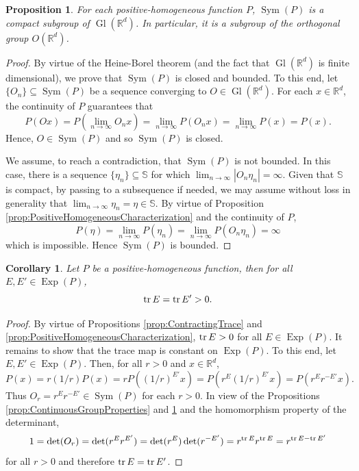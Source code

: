 \documentclass[11pt, letter]{book}
\newtheorem{corollary}[theorem]{Corollary}
\newtheorem{proposition}[theorem]{Proposition}
\newcommand\Gl{\operatorname{Gl}} %
\newcommand\Sym{\operatorname{Sym}}
\newcommand\Exp{\operatorname{Exp}}
\renewcommand\det{\operatorname{det}}
\begin{document}
\begin{framed}
\begin{proposition}\label{prop:SymCompact}
For each positive-homogeneous function $P$, $\Sym(P)$ is a compact subgroup of $\Gl(\mathbb{R}^d)$. In particular, it is a subgroup of the orthogonal group $O(\mathbb{R}^d)$.
\end{proposition}
\end{framed}
\begin{proof}
By virtue of the Heine-Borel theorem (and the fact that $\Gl(\mathbb{R}^d)$ is finite dimensional), we prove that $\Sym(P)$ is closed and bounded. To this end, let $\{O_n\}\subseteq\Sym(P)$ be a sequence converging to $O\in \Gl(\mathbb{R}^d)$. For each $x\in\mathbb{R}^d$, the continuity of $P$ guarantees that
\begin{equation*}
P(Ox)=P\left(\lim_{n\to\infty}O_nx\right)=\lim_{n\to\infty}P(O_nx)=\lim_{n\to\infty}P(x)=P(x).
\end{equation*}
Hence, $O\in\Sym(P)$ and so $\Sym(P)$ is closed.

We assume, to reach a contradiction, that $\Sym(P)$ is not bounded. In this case, there is a sequence $\{\eta_n\}\subseteq \mathbb{S}$ for which $\lim_{n\to\infty}|O_n\eta_n|=\infty$. Given that $\mathbb{S}$ is compact, by passing to a subsequence if needed, we may assume without loss in generality that $\lim_{n\to\infty}\eta_n=\eta\in\mathbb{S}$. By virtue of Proposition \ref{prop:PositiveHomogeneousCharacterization} and the continuity of $P$,
\begin{equation*}
P(\eta)=\lim_{n\to\infty}P(\eta_n)=\lim_{n\to\infty}P(O_n\eta_n)=\infty
\end{equation*}
which is impossible. Hence $\Sym(P)$ is bounded.
\end{proof}


\begin{framed}
\begin{corollary}\label{cor:TraceisInvariant}
Let $P$ be a positive-homogeneous function, then for all $E,E'\in\Exp(P)$,
\begin{equation*}
\tr E=\tr E'>0.
\end{equation*}
\end{corollary}
\end{framed}
\begin{proof}
By virtue of Propositions \ref{prop:ContractingTrace} and \ref{prop:PositiveHomogeneousCharacterization}, $\tr E>0$ for all $E\in\Exp(P)$. It remains to show that the trace map is constant on $\Exp(P)$. To this end, let $E,E'\in\Exp(P)$. Then, for all $r>0$ and $x\in\mathbb{R}^d$,
\begin{equation*}
P(x)=r(1/r)P(x)=rP((1/r)^{E'}x)=P(r^E(1/r)^{E'}x)=P(r^{E}r^{-E'}x).
\end{equation*}
Thus $O_r=r^{E}r^{-E'}\in\Sym(P)$ for each $r>0$. In view of the Propositions \ref{prop:ContinuousGroupProperties} and \ref{prop:SymCompact} and the homomorphism property of the determinant,
\begin{equation*}
1=\det(O_r)=\det(r^{E}r^{E'})=\det(r^{E})\det(r^{-E'})=r^{\tr E}r^{\tr E}=r^{\tr E-\tr E'}
\end{equation*}
for all $r>0$ and therefore $\tr E=\tr E'$.
\end{proof}
\end{document}
